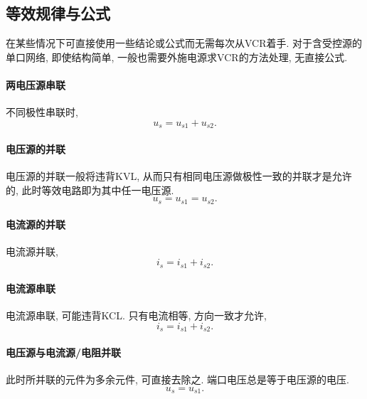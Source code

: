 \documentclass{ctexart}
\begin{document}

\subsection{等效规律与公式} %
\label{sub:等效规律与公式}

在某些情况下可直接使用一些结论或公式而无需每次从VCR着手. 对于含受控源的单口网络, 即使结构简单, 一般也需要外施电源求VCR的方法处理, 无直接公式.

\paragraph{两电压源串联} %
\label{par:两电压源串联}

不同极性串联时,
\[ u_s = u_{s1} + u_{s2}. \]


\paragraph{电压源的并联} %
\label{par:电压源的并联}

电压源的并联一般将违背KVL, 从而只有相同电压源做极性一致的并联才是允许的, 此时等效电路即为其中任一电压源.
\[ u_s = u_{s1} = u_{s2}. \]


\paragraph{电流源的并联} %
\label{par:电流源的并联}

电流源并联,
\[ i_s = i_{s1} + i_{s2}. \]


\paragraph{电流源串联} %
\label{par:电流源串联}

电流源串联, 可能违背KCL. 只有电流相等, 方向一致才允许,
\[ i_s = i_{s1} + i_{s2}. \]


\paragraph{电压源与电流源/电阻并联} %
\label{par:电压源与电流源_电阻并联}

此时所并联的元件为多余元件, 可直接去除之. 端口电压总是等于电压源的电压.
\[ u_s = u_{s1}. \]
\end{document}
